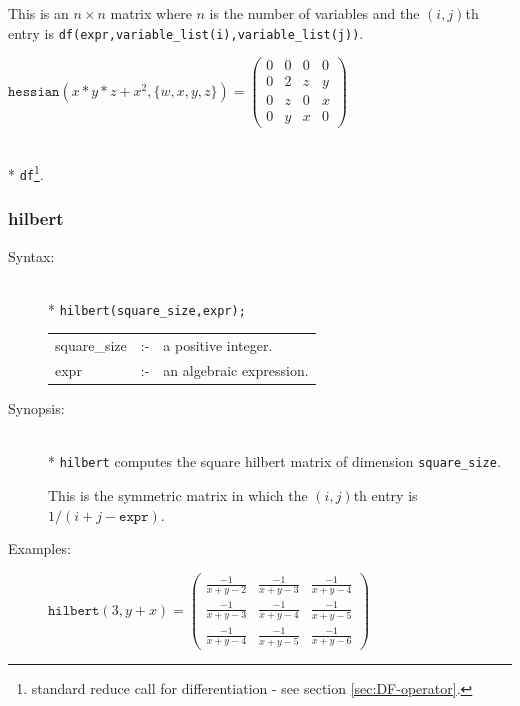 {\begin{description}
This is an $n\times n$ matrix where $n$ is the number of variables and the
$(i,j)$th entry is \texttt{df(expr,variable\_list(i),variable\_list(j))}.

\item[Examples:]
\begin{flushleft}
\(
\texttt{hessian}(x*y*z+x^2,\{w,x,y,z\}) =
 \begin{pmatrix} 0 & 0 & 0 & 0 \\ 0 & 2 & z & y \\ 0 & z & 0 & x \\ 0 & y & x & 0
  \end{pmatrix}
\)
\end{flushleft}

\item[Related functions:]\mbox{}\\*
\texttt{df}\footnote{standard reduce call for
differentiation - see section \protect\ref{sec:DF-operator}.}.
\end{description}


\subsubsection{hilbert}
\label{linalg:hilbert}
\hypertarget{operator:HILBERT}{}

\begin{description}
\item[Syntax:]\mbox{}\\*
\texttt{hilbert(square\_size,expr);}\\[2mm]
\begin{tabular}{l l l}
square\_size &:-& a positive integer. \\
expr         &:-& an algebraic expression.
\end{tabular}

\item[Synopsis:]\mbox{}\\*
\texttt{hilbert} computes the square hilbert matrix of
                dimension \texttt{square\_size}.

This is the symmetric matrix in which the $(i,j)$th entry is
$1/(i+j-\texttt{expr})$.

\item[Examples:]
\begin{flushleft}
\(
\texttt{hilbert}(3,y+x)  =
\begin{pmatrix} \frac{-1}{x+y-2} & \frac{-1}{x+y-3}
& \frac{-1}{x+y-4} \\ \frac{-1}{x+y-3} & \frac{-1}{x+y-4} &
\frac{-1}{x+y-5} \\ \frac{-1}{x+y-4} & \frac{-1}{x+y-5} &
\frac{-1}{x+y-6}
\end{pmatrix}
\)
\end{flushleft}
\end{description}


}
